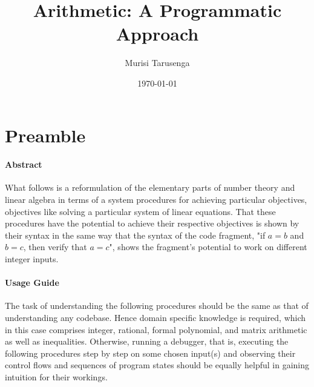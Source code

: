 \documentclass[twocolumn]{article}
\begin{document}
	\title{Arithmetic: A Programmatic Approach}
	\author{Murisi Tarusenga}
	\date{\today{} \currenttime}
	\maketitle
	\section{Preamble}
		\paragraph{Abstract}
			What follows is a reformulation of the elementary parts of number theory and linear algebra in terms of a system procedures for achieving particular objectives, objectives like solving a particular system of linear equations. That these procedures have the potential to achieve their respective objectives is shown by their syntax in the same way that the syntax of the code fragment, "if $a=b$ and $b=c$, then verify that $a=c$", shows the fragment's potential to work on different integer inputs.
		\paragraph{Usage Guide}
			The task of understanding the following procedures should be the same as that of understanding any codebase. Hence domain specific knowledge is required, which in this case comprises integer, rational, formal polynomial, and matrix arithmetic as well as inequalities. Otherwise, running a debugger, that is, executing the following procedures step by step on some chosen input(s) and observing their control flows and sequences of program states should be equally helpful in gaining intuition for their workings.
	\tableofcontents
\end{document}
